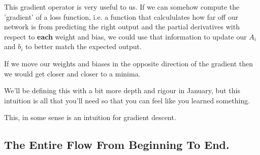 \documentclass[11pt]{article}
\begin{document}
This gradient operator is very useful to us. If we can somehow compute the 'gradient' of a loss function, i.e. a function that calcululates how far off our network is from predicting the right output and the partial derivatives with respect to \textbf{each} weight and bias, we could use that information to update our \(A_i\) and \(b_i\) to better match the expected output.

If we move our weights and biases in the opposite direction of the gradient then we would get closer and closer to a minima.

We'll be defining this with a bit more depth and rigour in January, but this intuition is all that you'll need so that you can feel like you learned something.

This, in some sense is an intuition for gradient descent.
\subsection{The Entire Flow From Beginning To End.}
\label{sec:orgd81b1f4}
\end{document}
